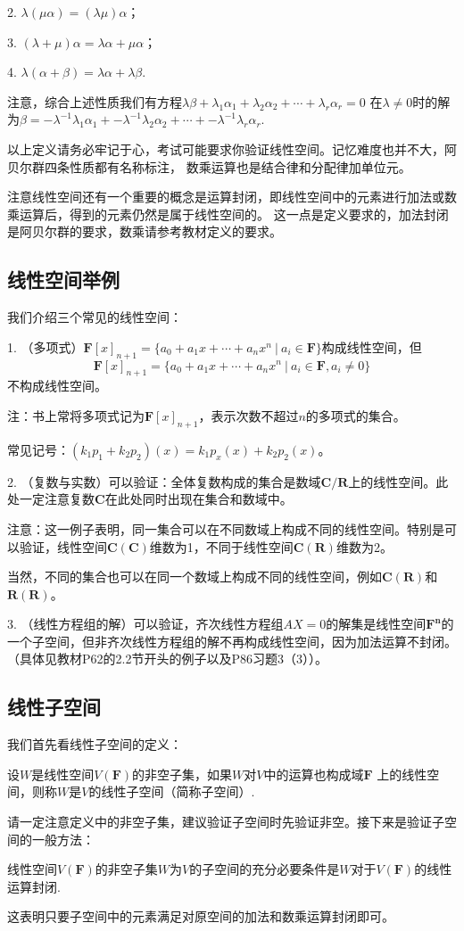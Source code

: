 2. $\lambda(\mu\alpha)=(\lambda\mu)\alpha$；

3. $(\lambda+\mu)\alpha=\lambda\alpha+\mu\alpha$；

4. $\lambda(\alpha+\beta)=\lambda\alpha+\lambda\beta$.

注意，综合上述性质我们有方程$\lambda\beta+\lambda_1\alpha_1+\lambda_2\alpha_2+\cdots+\lambda_r\alpha_r=0$
在$\lambda\neq 0$时的解为$\beta=-\lambda^{-1}\lambda_1\alpha_1+-\lambda^{-1}\lambda_2\alpha_2+\cdots+-\lambda^{-1}\lambda_r\alpha_r$.

以上定义请务必牢记于心，考试可能要求你验证线性空间。记忆难度也并不大，阿贝尔群四条性质都有名称标注，
数乘运算也是结合律和分配律加单位元。

注意线性空间还有一个重要的概念是运算封闭，即线性空间中的元素进行加法或数乘运算后，得到的元素仍然是属于线性空间的。
这一点是定义要求的，加法封闭是阿贝尔群的要求，数乘请参考教材定义的要求。
\subsection{线性空间举例}
我们介绍三个常见的线性空间：

1. （多项式）$\mathbf{F}[x]_{n+1}=\{a_0+a_1x+\cdots+a_nx^n\ |\ a_i\in\mathbf{F}\}$构成线性空间，但
$$\mathbf{F}[x]_{n+1}=\{a_0+a_1x+\cdots+a_nx^n\ |\ a_i\in\mathbf{F},a_i\neq 0\}$$
不构成线性空间。

注：书上常将多项式记为$\mathbf{F}[x]_{n+1}$，表示次数不超过$n$的多项式的集合。

常见记号：$(k_1p_1+k_2p_2)(x)=k_1p_x(x)+k_2p_2(x)$。

2. （复数与实数）可以验证：全体复数构成的集合是数域$\mathbf{C}/\mathbf{R}$上的线性空间。此处一定注意复数$\mathbf{C}$在此处同时出现在集合和数域中。

注意：这一例子表明，同一集合可以在不同数域上构成不同的线性空间。特别是可以验证，线性空间$\mathbf{C(C)}$维数为1，不同于线性空间$\mathbf{C(R)}$维数为2。

当然，不同的集合也可以在同一个数域上构成不同的线性空间，例如$\mathbf{C(R)}$和$\mathbf{R(R)}$。

3. （线性方程组的解）可以验证，齐次线性方程组$AX=0$的解集是线性空间$\mathbf{F^n}$的一个子空间，但非齐次线性方程组的解不再构成线性空间，因为加法运算不封闭。（具体见教材P62的2.2节开头的例子以及P86习题3（3））。
\subsection{线性子空间}
我们首先看线性子空间的定义：
\begin{definition}
	设$W$是线性空间$V(\mathbf{F})$的非空子集，如果$W$对$V$中的运算也构成域$\mathbf{F}$
	上的线性空间，则称$W$是$V$的线性子空间（简称子空间）.
\end{definition}
请一定注意定义中的非空子集，建议验证子空间时先验证非空。接下来是验证子空间的一般方法：
\begin{theorem}
	线性空间$V(\mathbf{F})$的非空子集$W$为$V$的子空间的充分必要条件是$W$对于$V(\mathbf{F})$的线性运算封闭.
\end{theorem}
这表明只要子空间中的元素满足对原空间的加法和数乘运算封闭即可。

